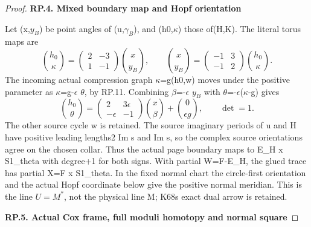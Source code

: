\begin{proof}
\par

\medskip\noindent\textbf{RP.4. Mixed boundary map and Hopf orientation}

\par\nobreak

Let (x,\(y_B\)) be point angles of (u,\(\gamma_B\)), and (h0,\(\kappa\)) those of(H,K).
The literal torus maps are
\[
\binom{h_0}{\kappa}=\begin{pmatrix}2&-3\\1&-1\end{pmatrix}
\binom{x}{y_B},\qquad
\binom{x}{y_B}=\begin{pmatrix}-1&3\\-1&2\end{pmatrix}
\binom{h_0}{\kappa}.
\tag{RP.12}
\]
The incoming actual compression graph \(\kappa\)=g(h0,w) moves under the
positive parameter as \(\kappa\)=g-\(\epsilon\) \(\theta\), by RP.11. Combining
\(\beta\)=-\(\epsilon\) \(y_B\) with \(\theta\)=-\(\epsilon\)(\(\kappa\)-g) gives
\[
\binom{h_0}{\theta}=\begin{pmatrix}2&3\epsilon\\-\epsilon&-1\end{pmatrix}
\binom{x}{\beta}+\binom0{\epsilon g},\qquad\det=1.
\tag{RP.13}
\]
The other source cycle w is retained. The source imaginary periods of
u and H have positive leading lengths2 Im s and Im s, so the complex
source orientations agree on the chosen collar. Thus the actual page
boundary maps to E\_H x S1\_theta with degree+1 for both signs. With
partial W=F-E\_H, the glued trace has partial X=F x S1\_theta.
In the fixed normal chart the circle-first orientation and the actual
Hopf coordinate below give the positive normal meridian. This is the
line \(U=M^*\), not the physical line M; K68\textquotesingle s exact dual arrow is retained.

\par

\medskip\noindent\textbf{RP.5. Actual Cox frame, full moduli homotopy and normal square}

\par\nobreak


\end{proof}
